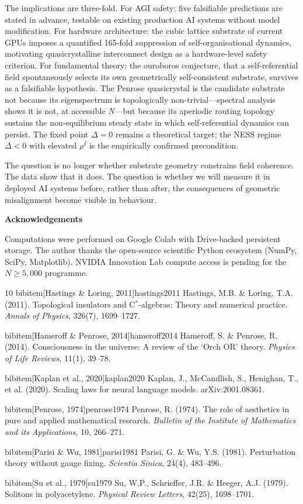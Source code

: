 \documentclass[11pt,a4paper]{article}
\begin{document}
The implications are three-fold. For AGI safety: five falsifiable predictions are stated in advance, testable on existing production AI systems without model modification. For hardware architecture: the cubic lattice substrate of current GPUs imposes a quantified 165-fold suppression of self-organisational dynamics, motivating quasicrystalline interconnect design as a hardware-level safety criterion. For fundamental theory: the ouroboros conjecture, that a self-referential field spontaneously selects its own geometrically self-consistent substrate, survives as a falsifiable hypothesis. The Penrose quasicrystal is the candidate substrate not because its eigenspectrum is topologically non-trivial---spectral analysis shows it is not, at accessible $N$---but because its aperiodic routing topology sustains the non-equilibrium steady state in which self-referential dynamics can persist. The fixed point $\Delta = 0$ remains a theoretical target; the NESS regime $\Delta < 0$ with elevated $\rho^I$ is the empirically confirmed precondition.

The question is no longer whether substrate geometry constrains field coherence. The data show that it does. The question is whether we will measure it in deployed AI systems before, rather than after, the consequences of geometric misalignment become visible in behaviour.

\bigskip
\noindent\textbf{Acknowledgements}

Computations were performed on Google Colab with Drive-backed persistent storage. The author thanks the open-source scientific Python ecosystem (NumPy, SciPy, Matplotlib). NVIDIA Innovation Lab compute access is pending for the $N \geq 5{,}000$ programme.


\begin{thebibliography}{10}
bibitem[Hastings \& Loring, 2011]{hastings2011}
Hastings, M.B. \& Loring, T.A. (2011). Topological insulators and C$^*$-algebras: Theory and numerical practice. \textit{Annals of Physics}, 326(7), 1699--1727.

bibitem[Hameroff \& Penrose, 2014]{hameroff2014}
Hameroff, S. \& Penrose, R. (2014). Consciousness in the universe: A review of the `Orch OR' theory. \textit{Physics of Life Reviews}, 11(1), 39--78.

bibitem[Kaplan et al., 2020]{kaplan2020}
Kaplan, J., McCandlish, S., Henighan, T., et al. (2020). Scaling laws for neural language models. arXiv:2001.08361.

bibitem[Penrose, 1974]{penrose1974}
Penrose, R. (1974). The role of aesthetics in pure and applied mathematical research. \textit{Bulletin of the Institute of Mathematics and its Applications}, 10, 266--271.

bibitem[Parisi \& Wu, 1981]{parisi1981}
Parisi, G. \& Wu, Y.S. (1981). Perturbation theory without gauge fixing. \textit{Scientia Sinica}, 24(4), 483--496.

bibitem[Su et al., 1979]{su1979}
Su, W.P., Schrieffer, J.R. \& Heeger, A.J. (1979). Solitons in polyacetylene. \textit{Physical Review Letters}, 42(25), 1698--1701.
\end{thebibliography}
\end{document}
